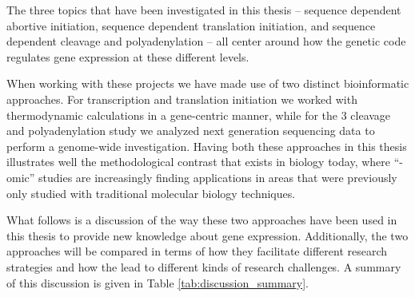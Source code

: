 %
The three topics that have been investigated in this thesis -- sequence
dependent abortive initiation, sequence dependent translation initiation, and
sequence dependent cleavage and polyadenylation -- all center around how the
genetic code regulates gene expression at these different levels.

When working with these projects we have made use of two distinct bioinformatic
approaches. For transcription and translation initiation we worked with
thermodynamic calculations in a gene-centric manner, while for the 3\ppp
cleavage and polyadenylation study we analyzed next generation sequencing data
to perform a genome-wide investigation. Having both these approaches in this
thesis illustrates well the methodological contrast that exists in biology
today, where ``-omic'' studies are increasingly finding applications in areas
that were previously only studied with traditional molecular biology
techniques.

What follows is a discussion of the way these two approaches have been used in
this thesis to provide new knowledge about gene expression. Additionally, the
two approaches will be compared in terms of how they facilitate different
research strategies and how the lead to different kinds of research challenges.
A summary of this discussion is given in Table \ref{tab:discussion_summary}.

\begin{table}[hb]
	\begin{center}
	\end{center}
	\caption{A summary of the discussion. The left column holds different
	characteristics that differ between the genome-wide and gene-centric
	studies.}
	\label{tab:discussion_summary}
\end{table}

